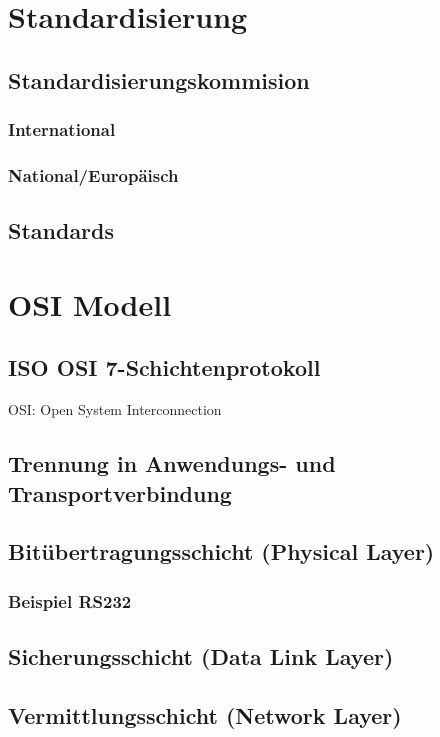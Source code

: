 \section{Standardisierung}
\subsection{Standardisierungskommision}
\subsubsection{International}
\subsubsection{National/Europäisch}
\subsection{Standards}

\section{OSI Modell}
\subsection*{ISO OSI 7-Schichtenprotokoll}
OSI: Open System Interconnection
\subsection*{Trennung in Anwendungs- und Transportverbindung}
\subsection{Bitübertragungsschicht (Physical Layer)}
\subsubsection*{Beispiel RS232}
\subsection{Sicherungsschicht (Data Link Layer)}
\subsection{Vermittlungsschicht (Network Layer)}
